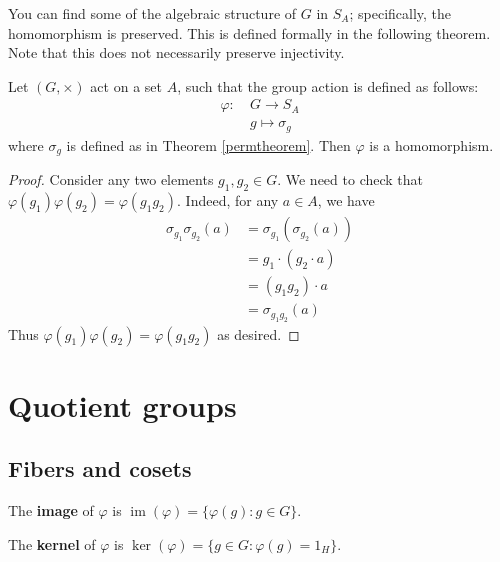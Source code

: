 \documentclass{article}
\theoremstyle{plain}
\begin{document}
You can find some of the algebraic structure of $G$ in $S_A$; specifically, the homomorphism is preserved. This is defined formally in the following theorem. Note that this does not necessarily preserve injectivity.
\begin{theorem}{}{}
Let $(G,\times)$ act on a set $A$, such that the group action is defined as follows:
\begin{align*}
\varphi : \ &G\to S_A \\
&g\mapsto \sigma_g
\end{align*}
where $\sigma_g$ is defined as in Theorem \ref{permtheorem}. Then $\varphi$ is a homomorphism.
\end{theorem}
\begin{proof}
Consider any two elements $g_1,g_2 \in G$. We need to check that $\varphi(g_1)\varphi(g_2) = \varphi(g_1g_2)$. Indeed, for any $a\in A$, we have
\begin{align*}
\sigma_{g_1}\sigma_{g_2}(a) &= \sigma_{g_1}(\sigma_{g_2}(a)) \\
&= g_1 \cdot (g_2 \cdot a) \\
&= (g_1g_2) \cdot a \\
&= \sigma_{g_1g_2}(a)
\end{align*}
Thus $\varphi(g_1)\varphi(g_2) = \varphi(g_1g_2)$ as desired.
\end{proof}

\section{Quotient groups}
\subsection{Fibers and cosets}
\begin{definition}{}{}
The \textbf{image} of $\varphi$ is $\operatorname{im}(\varphi) = \{ \varphi(g) : g \in G \}$.
\end{definition}

\begin{definition}{}{}
The \textbf{kernel} of $\varphi$ is $\operatorname{ker}(\varphi) = \{ g \in G : \varphi(g) = 1_H \}$.
\end{definition}
\end{document}
